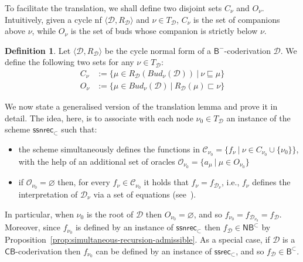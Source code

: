 \documentclass[manuscript,screen]{acmart}
\newcommand{\dfn}{:=}
\renewcommand{\emptyset}{\varnothing}
\theoremstyle{definition}
\newtheorem{defn}[thm]{Definition}
\theoremstyle{remark}
\newcommand{\permpref}{\subset}
\newcommand{\model}[1]{\denot{#1}}
\newcommand{\denot}[1]{f_{#1}}
\newcommand{\ssrecwfpo}[1]{\mathsf{ssrec}_{#1}}
\newcommand{\ssnrecwfpo}[1]{\mathsf{ssnrec}_{#1}}
\newcommand{\ssrecpp}{\ssrecwfpo{\permpref}}
\newcommand{\ssnrecpp}{\ssnrecwfpo{\permpref}}
\newcommand{\bc}{\mathsf{B}}
\newcommand{\bcwfpo}[1]{\bc^{#1}}
\newcommand{\bcnorec}{\bc^{-}}
\newcommand{\nested}{\mathsf{N}}
\newcommand{\nbcwfpo}[1]{\nested\bcwfpo{#1}}
\newcommand{\bcpp}{\bcwfpo{\permpref}}
\newcommand{\nbcpp}{\nbcwfpo{\permpref}}
\newcommand{\der}{\mathcal{D}}
\newcommand{\pder}[1]{\der_{#1}}
\newcommand{\rd}{{R}_\der}
\newcommand{\derrd}{\langle \der, \rd \rangle}
\newcommand{\bud}{\mathit{Bud}}
\newcommand{\close}[1]{{C}_{#1}}
\newcommand{\open}[1]{{O}_{#1}}
\newcommand{\hnu}{\nu_0}
\newcommand{\cyclic}{\mathsf{C}}
\newcommand{\cbc}{\cyclic\bc}
\begin{document}




To facilitate the translation, we shall define two disjoint  sets  $\close{\nu}$ and $\open{\nu}$. Intuitively, given a cycle nf $\derrd$ 
 and  $\nu\in T_\der$,  $\close{\nu}$ is the set of  companions above  $\nu$, while   $\open{\nu}$  is the set of  buds whose companion is strictly below   $\nu$. 



\begin{defn} 
Let $\derrd$ be the  cycle normal form of a $\bcnorec$-coderivation $\der$. We define the following two sets for any $\nu\in T_\der$:
\begin{equation*}
\begin{aligned}
\close{\nu}&\dfn \{ \mu \in \rd(\bud_\nu(\der))  \ \vert \ \nu \sqsubseteq \mu \}\\
\open{\nu}&\dfn \{ \mu \in \bud_\nu(\der) \ \vert \ \rd(\mu) \sqsubset \nu \}
\end{aligned}
\end{equation*}
\end{defn}

\newcommand{\amodel}[1]{a_{#1}}

We now state a generalised version of the translation lemma and prove it in  detail. The idea, here, is to associate with each node $\hnu\in T_\der$  an instance of the scheme  $\ssnrecpp$ such that:
\begin{itemize}
    \item the scheme  simultaneously defines the  functions in  $\mathcal{C}_{\hnu}=\{ \model{\nu} \ \vert \ \nu\in \close {\hnu} \cup \{\hnu \}\}$,   with the help of an additional set of oracles $\mathcal{O}_{\hnu}=\{ \amodel{\mu} \ \vert \ \mu\in \open{\hnu}\}$
    \item if  $\mathcal{O}_{\hnu}=\emptyset$ then,    for every $f_\nu\in \mathcal{C}_{\hnu}$   it holds that $\model{\nu}= \model{\pder \nu}$, i.e.,    $f_\nu$ defines  the interpretation of $\der_{\nu}$ via a set of equations (see~). 
\end{itemize}
In particular, when  $\hnu$ is the root of $\der$ then $\open{\hnu} = \emptyset$, and so $\model{\hnu}=\model{\pder \hnu}=\model{\der}$. Moreover, since  $\model{\hnu}$ is defined by an instance of   $\ssnrecpp$ then $\model{\der}\in \nbcpp$ by Proposition~\ref{prop:simultaneous-recursion-admissible}. As a special case,  if $\der$ is a $\cbc$-coderivation then $\model{\hnu}$ can be defined by an instance of   $\ssrecpp$, and so  $\model{\der}\in \bcpp$. 
\end{document}

